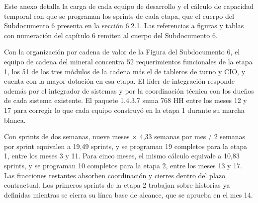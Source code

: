 \documentclass[anexo]{../../comun/overfore}
\begin{document}
Este anexo detalla la carga de cada equipo de desarrollo y el cálculo de capacidad temporal con que se programan los sprints de cada etapa, que el cuerpo del Subdocumento 6 presenta en la sección 6.2.1. Las referencias a figuras y tablas con numeración del capítulo 6 remiten al cuerpo del Subdocumento 6.

Con la organización por cadena de valor de la Figura  del Subdocumento 6, el equipo de cadena del mineral concentra 52 requerimientos funcionales de la etapa 1, los 51 de los tres módulos de la cadena más el de tableros de turno y CIO, y cuenta con la mayor dotación en esa etapa. El líder de integración responde además por el integrador de sistemas y por la coordinación técnica con los dueños de cada sistema existente. El paquete 1.4.3.7 suma 768 HH entre los meses 12 y 17 para corregir lo que cada equipo construyó en la etapa 1 durante su marcha blanca.

Con sprints de dos semanas, nueve meses × 4,33 semanas por mes / 2 semanas por sprint equivalen a 19,49 sprints, y se programan 19 completos para la etapa 1, entre los meses 3 y 11. Para cinco meses, el mismo cálculo equivale a 10,83 sprints, y se programan 10 completos para la etapa 2, entre los meses 13 y 17. Las fracciones restantes absorben coordinación y cierres dentro del plazo contractual. Los primeros sprints de la etapa 2 trabajan sobre historias ya definidas mientras se cierra su línea base de alcance, que se aprueba en el mes 14.
\end{document}
